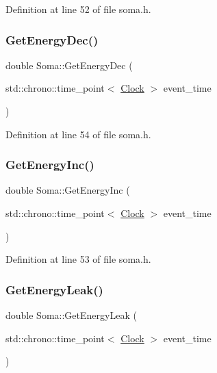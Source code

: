 Definition at line 52 of file soma.\+h.

\mbox{\label{class_soma_afbdc1f4e4f54adefea9a16fdca50aab5}} 
\subsubsection{\texorpdfstring{Get\+Energy\+Dec()}{GetEnergyDec()}}
{\footnotesize\ttfamily double Soma\+::\+Get\+Energy\+Dec (\begin{DoxyParamCaption}\item[{std\+::chrono\+::time\+\_\+point$<$ \mbox{\hyperlink{universe_8h_a0ef8d951d1ca5ab3cfaf7ab4c7a6fd80}{Clock}} $>$}]{event\+\_\+time }\end{DoxyParamCaption})\hspace{0.3cm}{\ttfamily [inline]}}



Definition at line 54 of file soma.\+h.

\mbox{\label{class_soma_a5d698a7ad270ad4ea63a3de5f25fa760}} 
\subsubsection{\texorpdfstring{Get\+Energy\+Inc()}{GetEnergyInc()}}
{\footnotesize\ttfamily double Soma\+::\+Get\+Energy\+Inc (\begin{DoxyParamCaption}\item[{std\+::chrono\+::time\+\_\+point$<$ \mbox{\hyperlink{universe_8h_a0ef8d951d1ca5ab3cfaf7ab4c7a6fd80}{Clock}} $>$}]{event\+\_\+time }\end{DoxyParamCaption})\hspace{0.3cm}{\ttfamily [inline]}}



Definition at line 53 of file soma.\+h.

\mbox{\label{class_soma_a0be69cd912f978f3ab3d94bebb9fbbaf}} 
\subsubsection{\texorpdfstring{Get\+Energy\+Leak()}{GetEnergyLeak()}}
{\footnotesize\ttfamily double Soma\+::\+Get\+Energy\+Leak (\begin{DoxyParamCaption}\item[{std\+::chrono\+::time\+\_\+point$<$ \mbox{\hyperlink{universe_8h_a0ef8d951d1ca5ab3cfaf7ab4c7a6fd80}{Clock}} $>$}]{event\+\_\+time }\end{DoxyParamCaption})\hspace{0.3cm}{\ttfamily [inline]}}




